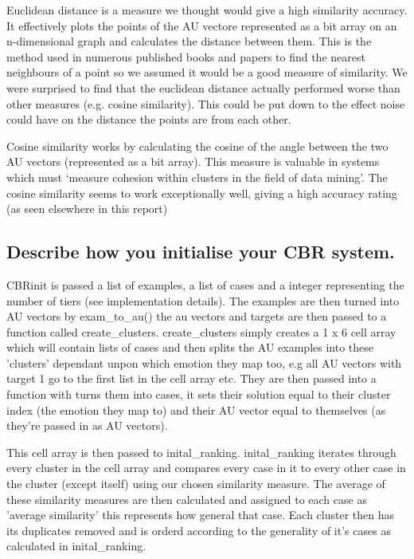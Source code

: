 \documentclass[11pt]{article}
\begin{document}
\begin{itemize}
\begin{itemize}
Euclidean distance is a measure we thought would give a high similarity accuracy. It
effectively plots the points of the AU vectore represented as a bit array
on an n-dimensional graph and calculates the
distance between them. This is the method used in numerous published books and papers
to find the nearest neighbours of a point so we assumed it would be a good measure of
similarity. We were surprised to find that the euclidean distance actually performed 
worse than other measures (e.g. cosine similarity). This could be put down to the effect
noise could have on the distance the points are from each other.

Cosine similarity works by calculating the cosine of the angle between the two AU vectors
(represented as a bit array). This measure is valuable in systems which must 
`measure cohesion within clusters in the field of data mining'. The cosine similarity
seems to work exceptionally well, giving a high accuracy rating (as seen elsewhere in this
report)


\subsection{Describe how you initialise your CBR system.}
CBRinit is passed a list of examples, a list of cases and a integer representing the number of tiers (see implementation details). The examples are then turned into AU vectors by exam_to_au() the au vectors and targets are then passed to a function called create_clusters. create_clusters simply creates a 1 x 6 cell array which will contain lists of cases and then splits the AU examples into these 'clusters' dependant unpon which emotion they map too, e.g all AU vectors with target 1 go to the first list in the cell array etc. They are then passed into a function with turns them into cases, it sets their solution equal to their cluster index (the emotion they map to) and their AU vector equal to themselves (as they're passed in as AU vectors).

This cell array is then passed to inital_ranking. inital_ranking iterates through every cluster in the cell array and compares every case in it to every other case in the cluster (except itself) using our chosen similarity measure. The average of these similarity measures are then calculated and assigned to each case as 'average similarity' this represents how general that case. Each cluster then has its duplicates removed and is orderd according to the generality of it's cases as calculated in inital_ranking. 


\end{itemize}
\end{itemize}
\end{document}
